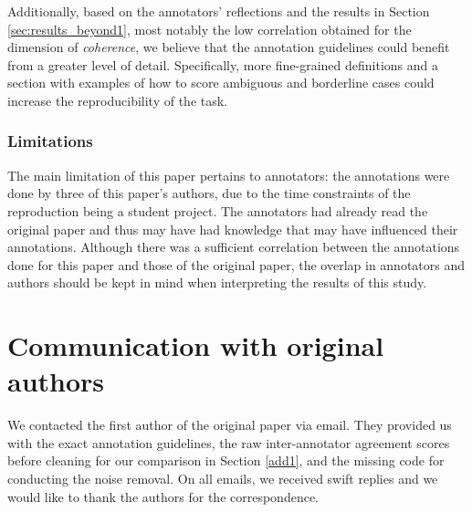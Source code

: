 Additionally, based on the annotators' reflections and the results in Section \ref{sec:results_beyond1}, most notably the low correlation obtained for the dimension of \textit{coherence}, we believe that the annotation guidelines could benefit from a greater level of detail. Specifically, more fine-grained definitions and a section with examples of how to score ambiguous and borderline cases could increase the reproducibility of the task.

\subsubsection{Limitations}
The main limitation of this paper pertains to annotators: the annotations were done by three of this paper's authors, due to the time constraints of the reproduction being a student project. The annotators had already read the original paper and thus may have had knowledge that may have influenced their annotations. Although there was a sufficient correlation between the annotations done for this paper and those of the original paper, the overlap in annotators and authors should be kept in mind when interpreting the results of this study. 

\section{Communication with original authors}
We contacted the first author of the original paper via email. They provided us with the exact annotation guidelines, the raw inter-annotator agreement scores before cleaning for our comparison in Section \ref{add1}, and the missing code for conducting the noise removal. On all emails, we received swift replies and we would like to thank the authors for the correspondence. 

